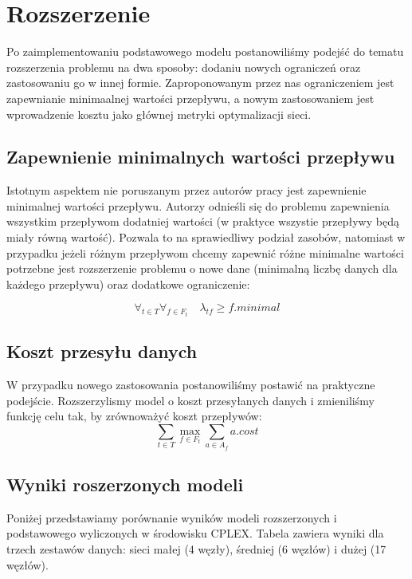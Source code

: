 \section{Rozszerzenie}

Po zaimplementowaniu podstawowego modelu postanowiliśmy podejść do tematu
rozszerzenia problemu na dwa sposoby: dodaniu nowych ograniczeń
oraz zastosowaniu go w innej formie. Zaproponowanym przez nas ograniczeniem jest
zapewnianie minimaalnej wartości przepływu, a nowym zastosowaniem jest wprowadzenie
kosztu jako głównej metryki optymalizacji sieci.

\subsection{Zapewnienie minimalnych wartości przepływu}

Istotnym aspektem nie poruszanym przez autorów pracy jest zapewnienie
minimalnej wartości przepływu. Autorzy odnieśli się do problemu zapewnienia wszystkim
przepływom dodatniej wartości (w praktyce wszystie przepływy będą miały równą wartość).
Pozwala to na sprawiedliwy podział zasobów, natomiast w przypadku jeżeli różnym
przepływom chcemy zapewnić różne minimalne wartości potrzebne jest rozszerzenie problemu
o nowe dane (minimalną liczbę danych dla każdego przepływu) oraz dodatkowe ograniczenie:

\begin{equation}
  \forall_{t \in T} \forall_{f \in F_t} \quad \lambda_{tf} \ge f.minimal
\end{equation}

\subsection{Koszt przesyłu danych}

W przypadku nowego zastosowania postanowiliśmy postawić na praktyczne podejście.
Rozszerzylismy model o koszt przesyłanych danych i zmieniliśmy funkcję celu tak,
by zrównoważyć koszt przepływów:
\begin{equation}
  \sum_{t \in T} \max_{f \in F_t} \sum_{a \in A_f} a.cost
\end{equation}

\subsection{Wyniki roszerzonych modeli}
Poniżej przedstawiamy porównanie wyników modeli rozszerzonych i podstawowego wyliczonych
w środowisku CPLEX. Tabela zawiera wyniki dla trzech zestawów danych: sieci małej (4 węzły),
średniej (6 węzłów) i dużej (17 węzłów).

